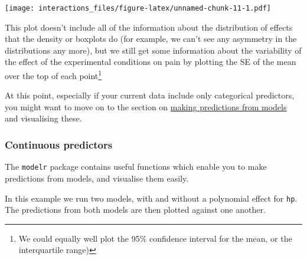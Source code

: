 \documentclass[]{article}
\newenvironment{Shaded}{\begin{snugshade}}{\end{snugshade}}
\newcommand{\DataTypeTok}[1]{\textcolor[rgb]{0.13,0.29,0.53}{#1}}
\newcommand{\DecValTok}[1]{\textcolor[rgb]{0.00,0.00,0.81}{#1}}
\newcommand{\KeywordTok}[1]{\textcolor[rgb]{0.13,0.29,0.53}{\textbf{#1}}}
\newcommand{\NormalTok}[1]{#1}
\newcommand{\OperatorTok}[1]{\textcolor[rgb]{0.81,0.36,0.00}{\textbf{#1}}}
\newcommand{\StringTok}[1]{\textcolor[rgb]{0.31,0.60,0.02}{#1}}
\let\rmarkdownfootnote\footnote%
\def\footnote{\protect\rmarkdownfootnote}
\begin{document}
\texttt{[image: interactions\_files/figure-latex/unnamed-chunk-11-1.pdf]}

This plot doesn't include all of the information about the distribution of
effects that the density or boxplots do (for example, we can't see any asymmetry
in the distributions any more), but we still get some information about the
variability of the effect of the experimental conditions on pain by plotting the
SE of the mean over the top of each point\footnote{We could equally well plot the 95\%
  confidence interval for the mean, or the interquartile range)}

At this point, especially if your current data include only categorical
predictors, you might want to move on to the section on
\href{predictions-and-margins.html}{making predictions from models} and visualising
these.

\hypertarget{continuous-predictors}{%
\subsubsection*{Continuous predictors}\label{continuous-predictors}}

The \texttt{modelr} package contains useful functions which enable you to make
predictions from models, and visualise them easily.

In this example we run two models, with and without a polynomial effect for
\texttt{hp}. The predictions from both models are then plotted against one another.

\begin{Shaded}
\end{Shaded}
\end{document}
